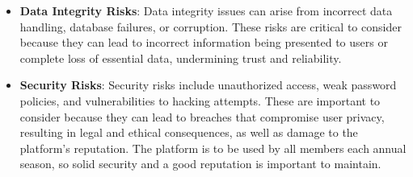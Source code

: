 \documentclass{article}
\begin{document}
\begin{enumerate}
    \begin{itemize}
        \item \textbf{Data Integrity Risks}: Data integrity issues can arise from incorrect data handling, database failures, or corruption. These risks are critical to consider because they can lead to incorrect information being presented to users or complete loss of essential data, undermining trust and reliability.
        \item \textbf{Security Risks}: Security risks include unauthorized access, weak password policies, and vulnerabilities to hacking attempts. These are important to consider because they can lead to breaches that compromise user privacy, resulting in legal and ethical consequences, as well as damage to the platform's reputation. The platform is to be used by all members each annual season, so solid security and a good reputation is important to maintain.
    \end{itemize}

\end{enumerate}
\end{document}

